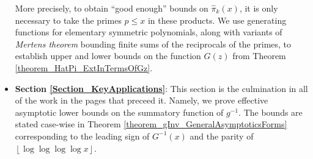 \documentclass[11pt,reqno,a4letter]{article}
\numberwithin{figure}{section}
\numberwithin{table}{section}
\newcommand{\floor}[1]{\left\lfloor #1 \right\rfloor}
\theoremstyle{plain}
\numberwithin{theorem}{section}
\theoremstyle{definition}
\begin{document}
\begin{itemize}
           More precisely, to obtain ``good enough'' bounds on 
           $\widehat{\pi}_k(x)$, it is only necessary to take the primes $p \leq x$ in these 
           products. We use generating functions for elementary symmetric polynomials, along with 
           variants of \emph{Mertens theorem} bounding finite sums of the reciprocals of the primes, 
           to establish upper and lower bounds on the function $G(z)$ from 
           Theorem \ref{theorem_HatPi_ExtInTermsOfGz}. 
     \item \textbf{Section \ref{Section_KeyApplications}}: 
           This section is the culmination in all of the work in the pages that preceed it. 
           Namely, we prove effective asymptotic lower bounds on the summatory function of $g^{-1}$. 
           The bounds are stated case-wise in Theorem \ref{theorem_gInv_GeneralAsymptoticsForms} 
           corresponding to the leading sign of 
           $G^{-1}(x)$ and the parity of $\floor{\log\log\log\log x}$. 
           

\end{itemize}
\end{document}
